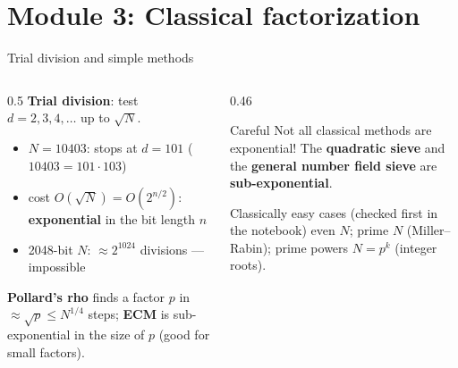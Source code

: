 \documentclass[aspectratio=169,11pt]{beamer}
\newcommand{\hl}[1]{{\color{qorange}\textbf{#1}}}
\newcommand{\key}[1]{{\color{qdark}\textbf{#1}}}
\begin{document}
\section{Module 3: Classical factorization}
\begin{frame}[label=fTrial]{Trial division and simple methods}
  \begin{columns}[T]
    \begin{column}{0.5\textwidth}
      \small
      \key{Trial division}: test $d = 2, 3, 4, \dots$ up to $\sqrt N$.
      \begin{itemize}\itemsep1pt
        \item $N = 10403$: stops at $d = 101$ ($10403 = 101\cdot103$)
        \item cost $O(\sqrt N) = O(2^{n/2})$: \hl{exponential} in the bit length $n$
        \item 2048-bit $N$: $\approx2^{1024}$ divisions --- impossible
      \end{itemize}
      \key{Pollard's rho} finds a factor $p$ in $\approx\sqrt p \le N^{1/4}$ steps; \key{ECM} is sub-exponential in the size of $p$ (good for small factors).
    \end{column}
    \begin{column}{0.46\textwidth}
      \begin{alertblock}{Careful}
        \small Not all classical methods are exponential! The \key{quadratic sieve} and the \key{general number field sieve} are \hl{sub-exponential}.
      \end{alertblock}
      \begin{block}{Classically easy cases (checked first in the notebook)}
        \small even $N$; prime $N$ (Miller--Rabin); prime powers $N = p^k$ (integer roots).
      \end{block}
    \end{column}
  \end{columns}
\end{frame}
\end{document}
